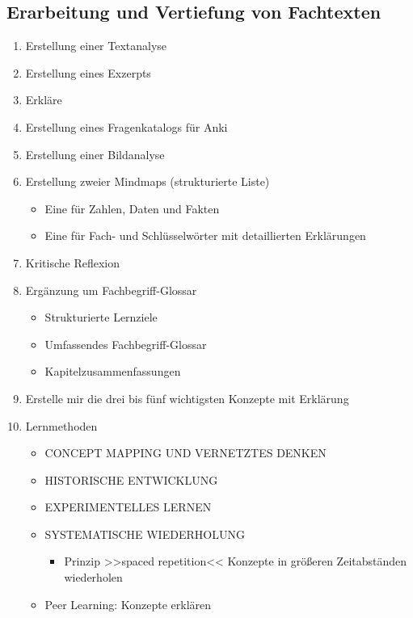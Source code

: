 \documentclass{vorlage-design-main}
\begin{document}
\newpage

\subsection{Erarbeitung und Vertiefung von
Fachtexten}\label{erarbeitung-und-vertiefung-von-fachtexten}

\begin{enumerate}
\def\labelenumi{\arabic{enumi}.}
\item
  Erstellung einer Textanalyse
\item
  Erstellung eines Exzerpts
\item
  Erkläre
\item
  Erstellung eines Fragenkatalogs für Anki
\item
  Erstellung einer Bildanalyse
\item
  Erstellung zweier Mindmaps (strukturierte Liste)

  \begin{itemize}

  \item
    Eine für Zahlen, Daten und Fakten
  \item
    Eine für Fach- und Schlüsselwörter mit detaillierten Erklärungen
  \end{itemize}
\item
  Kritische Reflexion
\item
  Ergänzung um Fachbegriff-Glossar

  \begin{itemize}

  \item
    Strukturierte Lernziele
  \item
    Umfassendes Fachbegriff-Glossar
  \item
    Kapitelzusammenfassungen
  \end{itemize}
\item
  Erstelle mir die drei bis fünf wichtigsten Konzepte mit Erklärung
\item
  Lernmethoden

  \begin{itemize}

  \item
    CONCEPT MAPPING UND VERNETZTES DENKEN
  \item
    HISTORISCHE ENTWICKLUNG
  \item
    EXPERIMENTELLES LERNEN
  \item
    SYSTEMATISCHE WIEDERHOLUNG

    \begin{itemize}

    \item
      Prinzip >>spaced repetition<< Konzepte in größeren Zeitabständen
      wiederholen
    \end{itemize}
  \item
    Peer Learning: Konzepte erklären
  \end{itemize}
\end{enumerate}


\clearpage
\printbibliography
\end{document}
